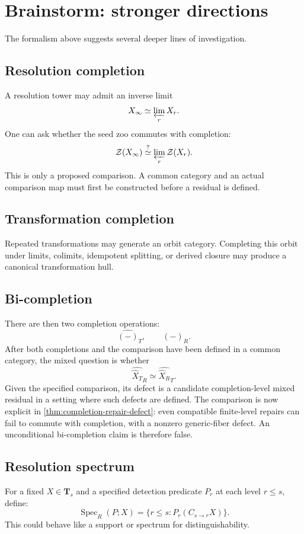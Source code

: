 \documentclass[11pt]{article}
\theoremstyle{definition}
\theoremstyle{remark}
\newcommand{\Tcat}{\mathbf T}
\newcommand{\Zoo}{\mathcal Z}
\begin{document}
\section{Brainstorm: stronger directions}

The formalism above suggests several deeper lines of investigation.

\subsection{Resolution completion}
A resolution tower may admit an inverse limit
\[
X_\infty\simeq\varprojlim_r X_r.
\]
One can ask whether the seed zoo commutes with completion:
\[
\Zoo(X_\infty)
\stackrel{?}{\simeq}
\varprojlim_r\Zoo(X_r).
\]
This is only a proposed comparison. A common category and an actual comparison map must first be constructed before a residual is defined.

\subsection{Transformation completion}
Repeated transformations may generate an orbit category. Completing this orbit under limits, colimits, idempotent splitting, or derived closure may produce a canonical transformation hull.

\subsection{Bi-completion}
There are then two completion operations:
\[
\widehat{(-)}_T,
\qquad
\widehat{(-)}_R.
\]
After both completions and the comparison have been defined in a common category, the mixed question is whether
\[
\widehat{\widehat X_T}_R
\simeq
\widehat{\widehat X_R}_T.
\]
Given the specified comparison, its defect is a candidate completion-level mixed residual in a setting where such defects are defined. The comparison is now explicit in \cref{thm:completion-repair-defect}: even compatible finite-level repairs can fail to commute with completion, with a nonzero generic-fiber defect. An unconditional bi-completion claim is therefore false.

\subsection{Resolution spectrum}
For a fixed $X\in\Tcat_s$ and a specified detection predicate $P_r$ at each level $r\le s$, define:
\[
\operatorname{Spec}_R(P;X)
=
\{r\le s:P_r(C_{s\to r}X)\}.
\]
This could behave like a support or spectrum for distinguishability.
\end{document}
